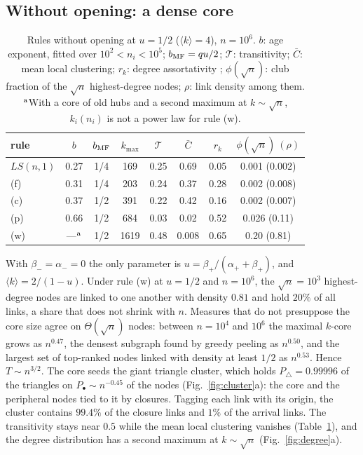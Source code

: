 \documentclass[aps,pre,twocolumn,superscriptaddress,floatfix,nofootinbib]{revtex4-2}
\begin{document}
\subsection{Without opening: a dense core}

\begin{table}[b]
\caption{Rules without opening at $u=1/2$ ($\langle k\rangle=4$), $n=10^6$.
$b$: age exponent, fitted over $10^2<n_i<10^5$; $b_{\rm MF}=qu/2$;
$\mathcal T$: transitivity; $\bar C$: mean local clustering; $r_k$: degree
assortativity \cite{newman2002}; $\phi(\sqrt n)$: club fraction of the $\sqrt n$ highest-degree
nodes; $\rho$: link density among them. $^{\rm a}$With a core of old hubs and a
second maximum at $k\sim\sqrt n$, $k_i(n_i)$ is not a power law for rule (w).}
\label{tab:rules}
\begin{ruledtabular}
\begin{tabular}{lccccccc}
rule & $b$ & $b_{\rm MF}$ & $k_{\max}$ & $\mathcal T$ & $\bar C$ & $r_k$ & $\phi(\sqrt n)\ (\rho)$\\
\hline
$LS(n,1)$ & 0.27 & 1/4 & 169 & 0.25 & 0.69 & 0.05 & 0.001 (0.002)\\
(f) & 0.31 & 1/4 & 203 & 0.24 & 0.37 & 0.28 & 0.002 (0.008)\\
(c) & 0.37 & 1/2 & 391 & 0.22 & 0.42 & 0.16 & 0.002 (0.007)\\
(p) & 0.66 & 1/2 & 684 & 0.03 & 0.02 & 0.52 & 0.026 (0.11)\\
(w) & ---$^{\rm a}$ & 1/2 & 1619 & 0.48 & 0.008 & 0.65 & 0.20 (0.81)\\
\end{tabular}
\end{ruledtabular}
\end{table}

With $\beta_-=\alpha_-=0$ the only parameter is $u=\beta_+/(\alpha_++\beta_+)$,
and $\langle k\rangle=2/(1-u)$. Under rule (w) at $u=1/2$ and $n=10^6$, the
$\sqrt n=10^3$ highest-degree nodes are linked to one another with density
$0.81$ and hold $20\%$ of all links, a share that does not shrink with $n$. Measures that do not presuppose the core size agree on
$\Theta(\sqrt n)$ nodes: between $n=10^4$ and $10^6$ the maximal $k$-core grows
as $n^{0.47}$, the densest subgraph found by greedy peeling
\cite{charikar2000} as $n^{0.50}$, and the largest set of top-ranked nodes linked with density at
least $1/2$ as $n^{0.53}$. Hence $T\sim n^{3/2}$. The core seeds the giant
triangle cluster, which holds $P_\triangle=0.99996$ of the triangles on
$P_\bullet\sim n^{-0.45}$ of the nodes (Fig.~\ref{fig:cluster}a): the core and
the peripheral nodes tied to it by closures. Tagging each link with its origin,
the cluster contains $99.4\%$ of the closure links and $1\%$ of the arrival
links. The transitivity stays near $0.5$ while the mean local clustering
vanishes (Table~\ref{tab:rules}), and the degree distribution has a second
maximum at $k\sim\sqrt n$ (Fig.~\ref{fig:degree}a).
\end{document}
